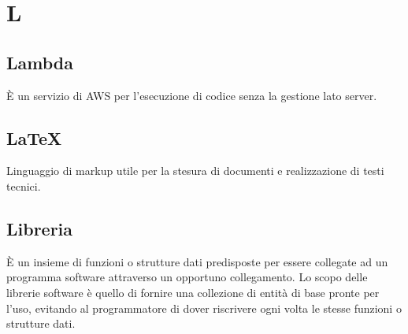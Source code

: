 \section*{L}

\subsection{Lambda}
È un servizio di AWS per l'esecuzione di codice senza la gestione lato server.

\subsection{LaTeX}
Linguaggio di markup utile per la stesura di documenti e realizzazione di testi tecnici. 

\subsection{Libreria}
È un insieme di funzioni o strutture dati predisposte per essere collegate ad un programma software attraverso un opportuno collegamento.
Lo scopo delle librerie software è quello di fornire una collezione di entità di base pronte per l'uso, evitando al programmatore di dover riscrivere ogni volta le stesse funzioni o strutture dati.